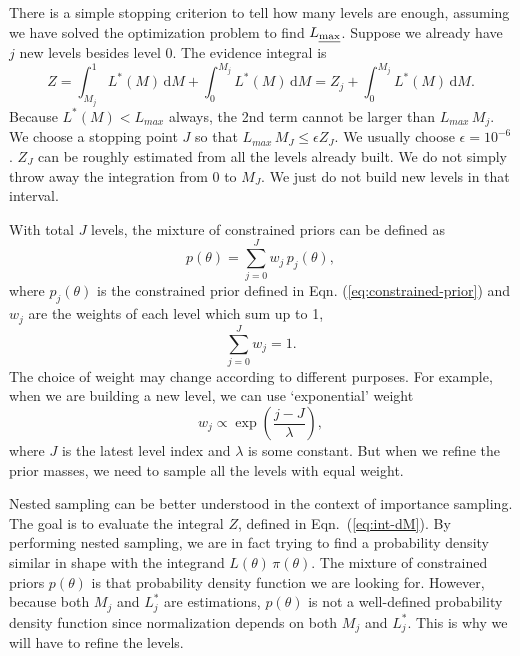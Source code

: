 \documentclass[letterpaper, preprint]{aastex}
\begin{document}
There is a simple stopping criterion to tell how many levels are enough, assuming we have solved the optimization problem to find $L_{\mbox{\scriptsize \em max}}$. Suppose we already have $j$ new levels besides level 0. The evidence integral is 
$$
Z= \int_{M_{j}}^1 L^*(M)\,\mathrm{d}M+\int_0^{M_j} L^*(M)\,\mathrm{d}M=Z_j+\int_0^{M_j} L^*(M)\,\mathrm{d}M.
$$
Because $L^*(M) < L_{max}$ always, the 2nd term cannot be larger than $L_{max}\,M_j$. We choose a stopping point $J$ so that $L_{max}\,M_J \leq \epsilon Z_J$. We usually choose $\epsilon = 10^{-6}$. $Z_J$ can be roughly estimated from all the levels already built. We do not simply throw away the integration from $0$ to $M_J$. We just do not build new levels in that interval.

With total $J$ levels, the mixture of constrained priors can be defined as
\begin{equation}
p(\theta) = \sum_{j=0}^J w_j\,p_{j}(\theta),
\label{eq:mixture-constrained-prior}
\end{equation}
where $p_{j}(\theta)$ is the constrained prior defined in Eqn. (\ref{eq:constrained-prior})
and $w_j$ are the weights of each level which sum up to 1,
\begin{equation}
\sum_{j=0}^J w_j = 1.
\label{eq:weight-sum-1}
\end{equation}
The choice of weight may change according to different purposes. For example, when we are building a new level, we can use `exponential' weight
\[
w_j \propto \exp{\left(\frac{j-J}{\lambda}\right)},
\]
where $J$ is the latest level index and $\lambda$ is some constant. \citep{brewer11a} But when we refine the prior masses, we need to sample all the levels with equal weight.

Nested sampling can be better understood in the context of importance sampling. The goal is to evaluate the integral $Z$, defined in Eqn.~(\ref{eq:int-dM}). By performing nested sampling, we are in fact trying to find a probability density similar in shape with the integrand $L(\theta)\,\pi(\theta)$. The mixture of constrained priors $p(\theta)$ is that probability density function we are looking for. However, because both $M_j$ and $L^*_j$ are estimations, $p(\theta)$ is not a well-defined probability density function since normalization depends on both $M_j$ and $L^*_j$. This is why we will have to refine the levels.
\end{document}
